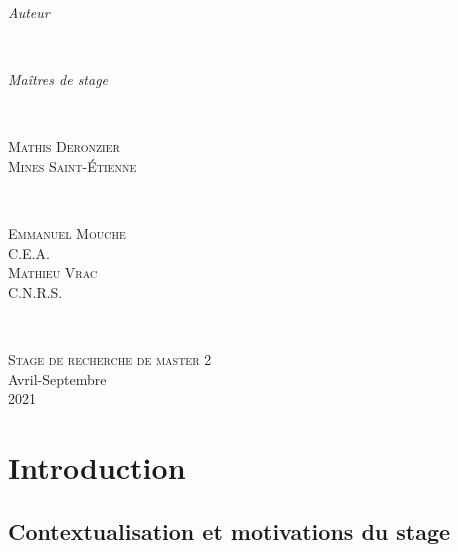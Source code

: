 \documentclass[a4paper,11pt]{article}
\numberwithin{equation}{section}
\begin{document}
	\begin{center}
	\begin{minipage}{0.4\textwidth}
		\begin{flushleft} \Large
			\emph{Auteur}\\
		\end{flushleft}
	\end{minipage}
	~
	\begin{minipage}{0.4\textwidth}
		\begin{flushright} \Large
			\emph{Maîtres de stage} \\
		\end{flushright}
	\end{minipage}\\[0.5 cm]
	\begin{minipage}{0.4\textwidth}
		\begin{flushleft} \large
			\textsc{Mathis Deronzier}\\
			\textsc{Mines Saint-Étienne}
		\end{flushleft}
	\end{minipage}
	~
	\begin{minipage}{0.4\textwidth}
		\begin{flushright} \large
			\textsc{Emmanuel Mouche}\\
			\textsc{C.E.A.}\\
			\textsc{Mathieu Vrac}\\
			\textsc{C.N.R.S.}
		\end{flushright}
	\end{minipage}\\[2cm]
	\end{center}
	\begin{center}
		\textsc{\Large Stage de recherche de master 2}\\[0.5cm]  
		\large Avril-Septembre\\2021\\[2cm]
	\end{center}
\setcounter{section}{-1}

\newpage

\tableofcontents

\vspace{2cm}

\newpage

\section{Introduction}
\label{ch:introduction}

\subsection{Contextualisation et motivations du stage}
\label{ch:Contextualisation et motivations du stage}
\end{document}
